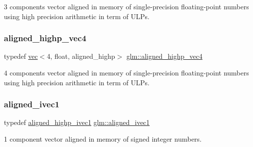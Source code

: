 3 components vector aligned in memory of single-\/precision floating-\/point numbers using high precision arithmetic in term of U\+L\+Ps. 

\mbox{\label{group__gtc__type__aligned_ga60d6561b0daa150c617f3a7a277e44ee}} 
\subsubsection{\texorpdfstring{aligned\+\_\+highp\+\_\+vec4}{aligned\_highp\_vec4}}
{\footnotesize\ttfamily typedef \mbox{\hyperlink{structglm_1_1vec}{vec}}$<$4, float, aligned\+\_\+highp$>$ \mbox{\hyperlink{group__gtc__type__aligned_ga60d6561b0daa150c617f3a7a277e44ee}{glm\+::aligned\+\_\+highp\+\_\+vec4}}}



4 components vector aligned in memory of single-\/precision floating-\/point numbers using high precision arithmetic in term of U\+L\+Ps. 

\mbox{\label{group__gtc__type__aligned_gafe9657c41fa58e912f99e92284d79fce}} 
\subsubsection{\texorpdfstring{aligned\+\_\+ivec1}{aligned\_ivec1}}
{\footnotesize\ttfamily typedef \mbox{\hyperlink{group__gtc__type__aligned_ga90ebad7148156f223d4743091c9870d5}{aligned\+\_\+highp\+\_\+ivec1}} \mbox{\hyperlink{group__gtc__type__aligned_gafe9657c41fa58e912f99e92284d79fce}{glm\+::aligned\+\_\+ivec1}}}



1 component vector aligned in memory of signed integer numbers. 

\mbox{\label{group__gtc__type__aligned_ga2a709e1d21f3aae3f8d6de910f5fdff4}} 
